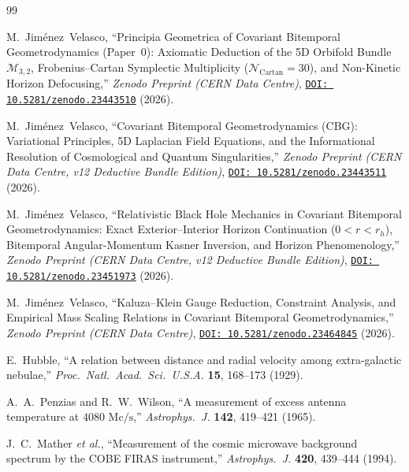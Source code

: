 \documentclass[11pt,a4paper]{article}
\theoremstyle{plain}
\theoremstyle{definition}
\theoremstyle{remark}
\numberwithin{equation}{section}
\begin{document}
\begin{thebibliography}{99}
\small
\setlength{\itemsep}{2pt}

M.~Jim\'enez~Velasco, ``Principia Geometrica of Covariant Bitemporal Geometrodynamics (Paper~0): Axiomatic Deduction of the 5D Orbifold Bundle $\mathcal{M}_{3,2}$, Frobenius--Cartan Symplectic Multiplicity ($\mathcal{N}_{\text{Cartan}} = 30$), and Non-Kinetic Horizon Defocusing,'' \textit{Zenodo Preprint (CERN Data Centre)}, \href{https://doi.org/10.5281/zenodo.23443510}{\texttt{DOI: 10.5281/zenodo.23443510}} (2026).

M.~Jim\'enez~Velasco, ``Covariant Bitemporal Geometrodynamics (CBG): Variational Principles, 5D Laplacian Field Equations, and the Informational Resolution of Cosmological and Quantum Singularities,'' \textit{Zenodo Preprint (CERN Data Centre, v12 Deductive Bundle Edition)}, \href{https://doi.org/10.5281/zenodo.23443511}{\texttt{DOI: 10.5281/zenodo.23443511}} (2026).

M.~Jim\'enez~Velasco, ``Relativistic Black Hole Mechanics in Covariant Bitemporal Geometrodynamics: Exact Exterior--Interior Horizon Continuation ($0 < r < r_h$), Bitemporal Angular-Momentum Kasner Inversion, and Horizon Phenomenology,'' \textit{Zenodo Preprint (CERN Data Centre, v12 Deductive Bundle Edition)}, \href{https://doi.org/10.5281/zenodo.23451973}{\texttt{DOI: 10.5281/zenodo.23451973}} (2026).

M.~Jim\'enez~Velasco, ``Kaluza--Klein Gauge Reduction, Constraint Analysis, and Empirical Mass Scaling Relations in Covariant Bitemporal Geometrodynamics,'' \textit{Zenodo Preprint (CERN Data Centre)}, \href{https://doi.org/10.5281/zenodo.23464845}{\texttt{DOI: 10.5281/zenodo.23464845}} (2026).

E.~Hubble, ``A relation between distance and radial velocity among extra-galactic nebulae,'' \textit{Proc.\ Natl.\ Acad.\ Sci.\ U.S.A.} \textbf{15}, 168--173 (1929).

A.~A.~Penzias and R.~W.~Wilson, ``A measurement of excess antenna temperature at $4080\text{ Mc/s}$,'' \textit{Astrophys.\ J.} \textbf{142}, 419--421 (1965).

J.~C.~Mather \textit{et al.}, ``Measurement of the cosmic microwave background spectrum by the COBE FIRAS instrument,'' \textit{Astrophys.\ J.} \textbf{420}, 439--444 (1994).


\end{thebibliography}
\end{document}
